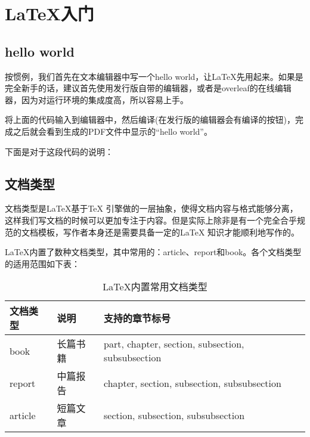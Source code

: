 \chapter{\LaTeX 入门}

\section{hello world}
按惯例，我们首先在文本编辑器中写一个hello world，让\LaTeX 先用起来。如果是完全新手的话，建议首先使用发行版自带的编辑器，或者是overleaf的在线编辑器，因为对运行环境的集成度高，所以容易上手。


将上面的代码输入到编辑器中，然后编译(在发行版的编辑器会有编译的按钮)，完成之后就会看到生成的PDF文件中显示的“hello
world”。

下面是对于这段代码的说明：
\begin{enumerate}
\end{enumerate}

\section{文档类型}
文档类型是\LaTeX 基于\TeX
引擎做的一层抽象，使得文档内容与格式能够分离，这样我们写文档的时候可以更加专注于内容。但是实际上除非是有一个完全合乎规范的文档模板，写作者本身还是需要具备一定的\LaTeX
知识才能顺利地写作的。

\LaTeX 内置了数种文档类型，其中常用的：article、report和book。各个文档类型的适用范围如下表：
\noindent
\begin{table}[ht]
	\begin{tabular}{lll} \toprule
		文档类型 & 说明     & 支持的章节标号                                    \\ \midrule
		book     & 长篇书籍 & part, chapter, section, subsection, subsubsection \\
		report   & 中篇报告 & chapter, section, subsection, subsubsection       \\
		article  & 短篇文章 & section, subsection, subsubsection                \\
		\bottomrule
	\end{tabular}
	\caption{\LaTeX 内置常用文档类型}
\end{table}

